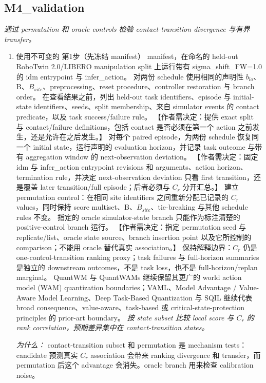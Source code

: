 \documentclass[10pt,a4paper]{article}
\begin{document}
\subsection*{M4\_validation}
\emph{通过 permutation 和 oracle controls 检验 contact-transition divergence 与有界 transfer。}
\begin{enumerate}[leftmargin=*,start=5]
  \item 使用不可变的 第1步（先冻结 manifest） manifest，在命名的 held-out RoboTwin 2.0/LIBERO manipulation split 上运行带有 sigma\_shift\_FW=1.0 的 idm entrypoint 与 infer\_action。 对两份 schedule 使用相同的声明性 \(b_{lo}\)、B、\(B_{site}\)、preprocessing、reset procedure、controller restoration 与 branch order。 在查看结果之前，列出 held-out task identifiers、episode 与 initial-state identifiers、seeds、split membership、来自 simulator events 的 contact predicate，以及 task success/failure rule。 【作者需决定：提供 exact split 与 contact/failure definitions，包括 contact 是否必须在第一个 action 之前发生，还是允许在之后发生。】 对每个 paired episode，为两份 schedule 恢复同一个 initial state，运行声明的 evaluation horizon，并记录 task outcome 与带有 aggregation window 的 next-observation deviation。 【作者需决定：固定 idm 与 infer\_action entrypoint revisions 和 arguments、action horizon、termination rule，并决定 next-observation deviation 只看 first transition，还是覆盖 later transition/full episode；后者必须与 \(C_{r}\) 分开汇总。】 建立 permutation control：在相同 site identifiers 之间重新分配已记录的 \(C_{r}\) values，同时保持 score multiset、B、\(B_{site}\)、tie-breaking 与其他 schedule rules 不变。 指定的 oracle simulator-state branch 只能作为标注清楚的 positive-control branch 运行。 【作者需决定：指定 permutation seed 与 replicate/list、oracle state source、branch insertion point 以及它所控制的 comparison；不能用 oracle 替代真实 association。】 保持解释边界：\(C_{r}\) 仍是 one-control-transition ranking proxy；task failures 与 full-horizon summaries 是独立的 downstream outcomes，不是 task loss，也不是 full-horizon/replan marginal。 QuantWM 与 QuantWAMs 继续保留其更广的 world action model (WAM) quantization boundaries；VAML、Model Advantage / Value-Aware Model Learning、Deep Task-Based Quantization 与 SQIL 继续代表 broad consequence、value-aware、task-based 或 critical-state-protection principles 的 prior-art boundary。
\noindent\emph{按 state subset 比较 local score 与 \(C_{r}\) 的 rank correlation，预期差异集中在 contact-transition states。}
\par{}
\par\emph{为什么：} contact-transition subset 和 permutation 是 mechanism tests：candidate 预测真实 \(C_{r}\) association 会带来 ranking divergence 和 transfer，而 permutation 后这个 advantage 会消失。oracle branch 用来检查 calibration noise。
\end{enumerate}
\end{document}

